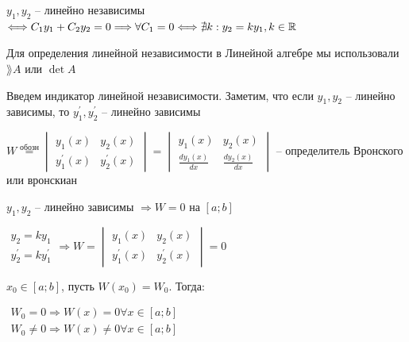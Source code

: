 \documentclass[12pt]{article}
\begin{document}
    \hypertarget{linearindependance}{}

    \Def $y_1, y_2$ -- линейно независимы $\Longleftrightarrow C_1 y_1 + C_2 y_2 = 0 \Longrightarrow \forall C_1 = 0 \Longleftrightarrow \nexists k : y_2 = k y_1, k \in \mathbb{R}$

    \Mem Для определения линейной независимости в Линейной алгебре мы использовали $\rang A$ или $\det A$

    Введем индикатор линейной независимости.
    Заметим, что если $y_1, y_2$ -- линейно зависимы, то $y_1^\prime, y_2^\prime$ -- линейно зависимы

    \hypertarget{determinantWronski}{}

    \Def $W \stackrel{\text{обозн}}{=} \begin{vmatrix}y_1(x) & y_2(x) \\ y_1^\prime(x) & y_2^\prime(x)\end{vmatrix} = \begin{vmatrix}y_1(x) & y_2(x) \\ \frac{d y_1(x)}{dx} & \frac{d y_2(x)}{dx}\end{vmatrix}$ -- определитель Вронского или вронскиан

    \begin{MyTheorem}
         $y_1, y_2$ -- линейно зависимы $\Longrightarrow W = 0$ на $[a;b]$
    \end{MyTheorem}

    \begin{MyProof}
        $\begin{matrix}y_2 = k y_1 \\ y_2^\prime = k y_1^\prime\end{matrix} \Longrightarrow W = \begin{vmatrix}y_1(x) & y_2(x) \\ y_1^\prime(x) & y_2^\prime(x)\end{vmatrix} = 0$
    \end{MyProof}

    \begin{MyTheorem}
         $x_0 \in [a;b]$, пусть $W(x_0) = W_0$. Тогда: 
        
        $\begin{matrix}W_0 = 0 \Longrightarrow W(x) = 0 \forall x \in [a;b] \\
        W_0 \neq 0 \Longrightarrow W(x) \neq 0 \forall x \in [a;b]\end{matrix}$
    \end{MyTheorem}
\end{document}
